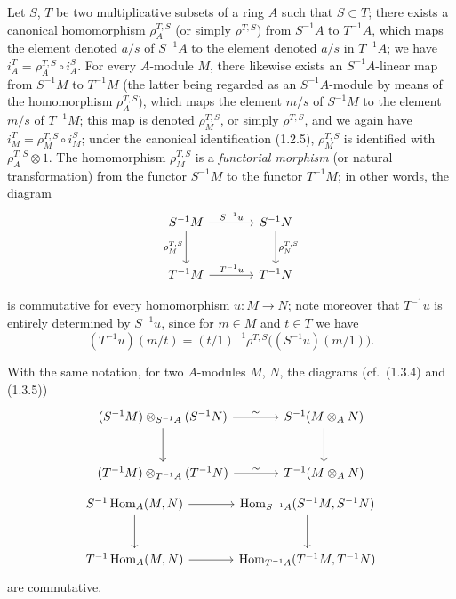 \begin{env}[1.4.1]
\label{0.1.4.1}
Let $S$, $T$ be two multiplicative subsets of a ring $A$ such that $S\subset T$; there exists a canonical homomorphism $\rho_A^{T,S}$ (or simply $\rho^{T,S}$) from $S^{-1}A$ to $T^{-1}A$, which maps the element denoted $a/s$ of $S^{-1}A$ to the element denoted $a/s$ in $T^{-1}A$; we have $i_A^T=\rho_A^{T,S}\circ i_A^S$.
For every $A$-module $M$, there likewise exists an $S^{-1}A$-linear map from $S^{-1}M$ to $T^{-1}M$ (the latter being regarded as an $S^{-1}A$-module by means of the homomorphism $\rho_A^{T,S}$), which maps the element $m/s$ of $S^{-1}M$ to the element $m/s$ of $T^{-1}M$; this map is denoted $\rho_M^{T,S}$, or simply $\rho^{T,S}$, and we again have $i_M^T=\rho_M^{T,S}\circ i_M^S$;
under the canonical identification (1.2.5), $\rho_M^{T,S}$ is identified with $\rho_A^{T,S}\otimes 1$.
The homomorphism $\rho_M^{T,S}$ is a \emph{functorial morphism} (or natural transformation) from the functor $S^{-1}M$ to the functor $T^{-1}M$; in other words, the diagram
\[
\begin{tikzcd}[column sep=large,row sep=large]
S^{-1}M \arrow[r,"S^{-1}u"] \arrow[d,"\rho_M^{T,S}"'] & S^{-1}N \arrow[d,"\rho_N^{T,S}"] \\
T^{-1}M \arrow[r,"T^{-1}u"] & T^{-1}N
\end{tikzcd}
\]

is commutative for every homomorphism $u:M\to N$; note moreover that $T^{-1}u$ is entirely determined by $S^{-1}u$, since for $m\in M$ and $t\in T$ we have
\[
  (T^{-1}u)(m/t)=(t/1)^{-1}\rho^{T,S}\bigl((S^{-1}u)(m/1)\bigr).
\]
\end{env}

\begin{env}[1.4.2]
\label{0.1.4.2}
With the same notation, for two $A$-modules $M$, $N$, the diagrams (cf.\ (1.3.4) and (1.3.5))
\[
\begin{tikzcd}[column sep=large,row sep=large]
(S^{-1}M)\otimes_{S^{-1}A}(S^{-1}N) \arrow[r,"\sim"] \arrow[d]
  & S^{-1}(M\otimes_A N) \arrow[d]
  \\
(T^{-1}M)\otimes_{T^{-1}A}(T^{-1}N) \arrow[r,"\sim"]
  & T^{-1}(M\otimes_A N)
\end{tikzcd}
\]
\[
\begin{tikzcd}[column sep=large,row sep=large]
S^{-1}\operatorname{Hom}_A(M,N) \arrow[r] \arrow[d]
  & \operatorname{Hom}_{S^{-1}A}(S^{-1}M,S^{-1}N) \arrow[d] \\
T^{-1}\operatorname{Hom}_A(M,N) \arrow[r]
  & \operatorname{Hom}_{T^{-1}A}(T^{-1}M,T^{-1}N)
\end{tikzcd}
\]
are commutative.
\end{env}

